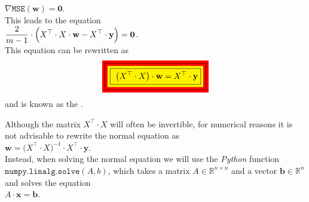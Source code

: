 \hspace*{1.3cm}
$\nabla \mathtt{MSE}(\mathbf{w}) = \mathbf{0}$.
\\[0.2cm]
This leads to the equation
\\[0.2cm]
\hspace*{1.3cm}
$\displaystyle\frac{2}{m-1} \cdot \Bigl(X^\top \cdot X \cdot \mathbf{w} - X^\top \cdot \mathbf{y}\Bigr) = \mathbf{0}$.
\\[0.2cm]
This equation can be rewritten as
\begin{equation}
  \label{eq:normal-equation}
 \colorbox{red}{\framebox{\colorbox{yellow}{\framebox{
 $\ds\bigl(X^\top \cdot X\bigr) \cdot \mathbf{w} = X^\top \cdot \mathbf{y}$}}}} 
\end{equation}
and is known as the .  

\remark
Although the matrix $X^\top \cdot X$ will often be invertible, for numerical reasons it is not
advisable to rewrite the normal equation as
\\[0.2cm]
\hspace*{1.3cm}
$\mathbf{w} = \bigl(X^\top \cdot X)^{-1} \cdot X^\top \cdot \mathbf{y}$.
\\[0.2cm]
Instead, when solving the normal equation we will use the \textsl{Python} function $\texttt{numpy.linalg.solve}(A,b)$, which
takes a matrix $A \in \mathbb{R}^{n \times n}$ and a vector $\mathbf{b} \in \mathbb{R}^n$ and solves the equation
\\[0.2cm]
\hspace*{1.3cm}
$A \cdot \mathbf{x} = \mathbf{b}$.  \eox

